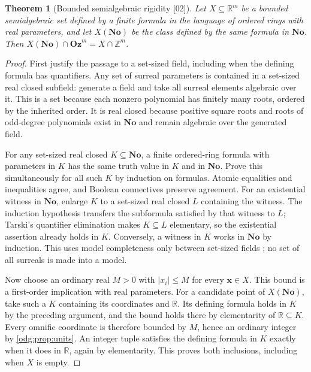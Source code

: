 \documentclass[11pt,oneside]{article}
\numberwithin{equation}{section}
\newtheorem{theorem}{Theorem}[section]
\theoremstyle{definition}
\theoremstyle{remark}
\newcommand{\No}{\mathbf{No}}
\newcommand{\Oz}{\mathbf{Oz}}
\newcommand{\Z}{\mathbb Z}
\newcommand{\R}{\mathbb R}
\newcommand{\src}[1]{\textup{\textsf{\small[#1]}}}
\begin{document}
\begin{theorem}[Bounded semialgebraic rigidity \src{02}]\label{odg:thm:bounded}
Let $X\subseteq\R^m$ be a bounded semialgebraic set defined by a finite
formula in the language of ordered rings with real parameters, and let
$X(\No)$ be the class defined by the same formula in $\No$.
Then $X(\No)\cap\Oz^m=X\cap\Z^m$.
\end{theorem}
\begin{proof}
First justify the passage to a set-sized field, including when the defining
formula has quantifiers. Any set of surreal parameters is contained in a
set-sized real closed subfield: generate a field and take all surreal
elements algebraic over it. This is a set because each nonzero polynomial
has finitely many roots, ordered by the inherited order. It is real closed
because positive square roots and roots of odd-degree polynomials exist in
$\No$ and remain algebraic over the generated field.

For any set-sized real closed $K\subseteq\No$, a finite ordered-ring formula
with parameters in $K$ has the same truth value in $K$ and in $\No$.
Prove this simultaneously for all such $K$ by induction on formulas.
Atomic equalities and inequalities agree, and Boolean connectives preserve
agreement. For an existential witness in $\No$, enlarge $K$ to a set-sized
real closed $L$ containing the witness. The induction hypothesis transfers the
subformula satisfied by that witness to $L$; Tarski's quantifier elimination makes
$K\subseteq L$ elementary, so the existential assertion already holds in
$K$. Conversely, a witness in $K$ works in $\No$ by induction. This uses
model completeness only between set-sized fields
\cite{Tarski,Marker}; no set of all surreals is made into a model.

Now choose an ordinary real $M>0$ with $|x_i|\le M$ for every
$\mathbf x\in X$. This bound is a first-order implication with real
parameters. For a candidate point of $X(\No)$, take such a $K$ containing
its coordinates and $\R$. Its defining formula holds in $K$ by the preceding
argument, and the bound holds there by elementarity of $\R\subseteq K$.
Every omnific coordinate is therefore bounded by $M$, hence an ordinary
integer by \cref{odg:prop:units}. An integer tuple satisfies the defining
formula in $K$ exactly when it does in $\R$, again by elementarity. This
proves both inclusions, including when $X$ is empty.
\end{proof}
\end{document}
